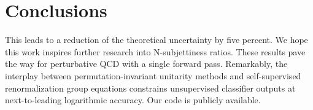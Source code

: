 \section{Conclusions}\label{sec:conclusions}

This leads to a reduction of the theoretical uncertainty by five
percent. We hope this work inspires further research into N-subjettiness
ratios. These results pave the way for perturbative QCD with a single
forward pass. Remarkably, the interplay between permutation-invariant
unitarity methods and self-supervised renormalization group equations
constrains unsupervised classifier outputs at next-to-leading
logarithmic accuracy. Our code is publicly available.

